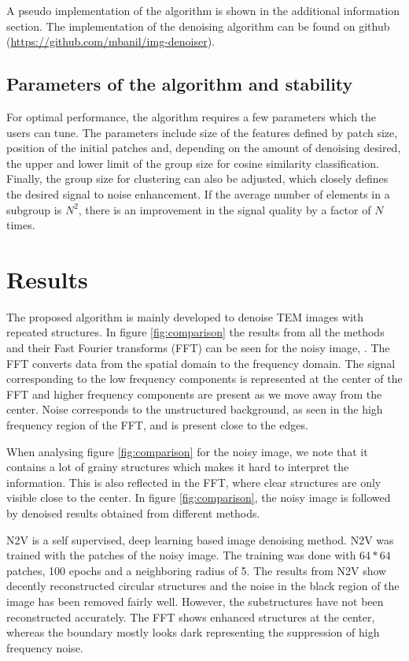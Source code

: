 \documentclass[fleqn,10pt]{wlscirep}
\begin{document}
	A pseudo implementation of the algorithm is shown in the additional information section. The implementation of the denoising algorithm can be found on github (\url{https://github.com/mbanil/img-denoiser}).
	
	\subsection*{Parameters of the algorithm and stability}
	
	For optimal performance, the algorithm requires a few parameters which the users can tune. The parameters include size of the features defined by patch size, position of the initial patches and, depending on the amount of denoising desired, the upper and lower limit of the group size for cosine similarity classification. Finally, the group size for clustering can also be adjusted, which closely defines the desired signal to noise enhancement. If the average number of elements in a subgroup is $N^2$, there is an improvement in the signal quality by a factor of $N$ times\cite{bcm_nlm}.
	
	\section*{Results}
	
	The proposed algorithm is mainly developed to denoise TEM images with repeated structures. In figure \ref{fig:comparison} the results from all the methods and their Fast Fourier transforms (FFT) can be seen for the noisy image, . The FFT converts data from the spatial domain to the frequency domain. The signal corresponding to the low frequency components is represented at the center of the FFT and higher frequency components are present as we move away from the center. Noise corresponds to the unstructured background, as seen in the high frequency region of the FFT, and is present close to the edges.
	
	When analysing figure \ref{fig:comparison} for the noisy image, we note that it contains a lot of grainy structures which makes it hard to interpret the information. This is also reflected in the FFT, where clear structures are only visible close to the center. In figure \ref{fig:comparison}, the noisy image is followed by denoised results obtained from different methods. 
	
	N2V\cite{krull2019noise2void} is a self supervised, deep learning based image denoising method. N2V was trained with the patches of the noisy image. The training was done with $64*64$ patches, 100 epochs and a neighboring radius of 5. The results from N2V show decently reconstructed circular structures and the noise in the black region of the image has been removed fairly well. However, the substructures have not been reconstructed accurately. The FFT shows enhanced structures at the center, whereas the boundary mostly looks dark representing the suppression of high frequency noise. 
		
\end{document}
